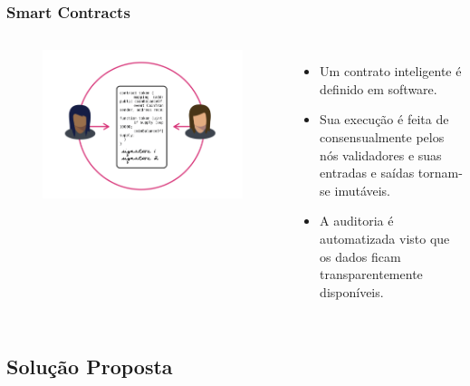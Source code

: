 \documentclass[11pt, red]{beamer}
\begin{document}
\begin{frame}
    \frametitle{Smart Contracts}
    \begin{beamerboxesrounded}[lower=fundobranco]{}
        \begin{columns}
        \scriptsize
        \begin{figure}[htb]
            \begin{center}
                \includegraphics[width=1.2\linewidth]{fig/smartcontract.png}
            \end{center}
        \end{figure}
            \begin{itemize}
            	\item Um contrato inteligente \'e definido em software.
                \item Sua execu\c{c}\~ao \'e feita de consensualmente pelos n\'os validadores e suas entradas e sa\'idas tornam-se imut\'aveis.
                \item A auditoria \'e automatizada visto que os dados ficam transparentemente dispon\'iveis.
            \end{itemize}
        \end{columns}
    \end{beamerboxesrounded}
\end{frame}

\subsection[Solu\c{c}\~ao Proposta]{Solu\c{c}\~ao Proposta}
\end{document}
